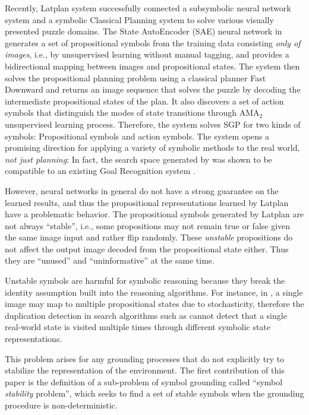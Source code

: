 Recently, Latplan system \cite[]{Asai2018} successfully
connected a subsymbolic neural network system and a symbolic Classical Planning system
to solve various visually presented puzzle domains.
The State AutoEncoder (SAE) neural network in \latentplanner
generates a set of propositional symbols from the training data consisting \emph{only of images},
i.e., by unsupervised learning without manual tagging,
and provides a bidirectional mapping between images and propositional states.
% 
The system then solves the propositional planning problem using a classical planner Fast Downward \cite{Helmert04}
and returns an image sequence that solves the puzzle
by decoding the intermediate propositional states of the plan.
It also discovers a set of action symbols that distinguish the modes of
state transitions through AMA$_2$ unsupervised learning process.
Therefore, the system solves SGP for two kinds of symbols:
Propositional symbols and action symbols.
% 
The system opens a promising direction for
applying a variety of symbolic methods to the real world, \emph{not just planning}:
In fact, the search space generated by \latentplanner was shown to be compatible
to an existing Goal Recognition system \cite{amado2018goal}.

However,
neural networks in general do not have a strong guarantee on the learned results,
and thus the propositional representations learned by Latplan have a problematic behavior.
The propositional symbols generated by Latplan are not always
``stable'', i.e., some propositions may not remain true or false given the same image input
and rather flip randomly.
These \emph{unstable} propositions do not affect the output image decoded from the propositional state either.
Thus they are ``unused'' and ``uninformative'' at the same time.

Unstable symbols are harmful for symbolic reasoning because
they break the identity assumption built into the reasoning algorithms.
For instance, in \latentplanner, 
a single image may map to multiple propositional states due to stochasticity,
therefore the duplication detection in search algorithms such as \astar \cite{hart1968formal}
cannot detect that a single real-world state is visited multiple times through
different symbolic state representations.

This problem arises for any grounding processes that do not explicitly try to stabilize the
representation of the environment.
The first contribution of this paper is the definition of a sub-problem of symbol grounding
called ``symbol \emph{stability} problem'', which seeks to find a set of stable symbols
when the grounding procedure is non-deterministic.

